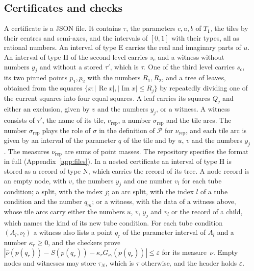 \documentclass[11pt]{amsart}
\theoremstyle{definition}
\theoremstyle{remark}
\numberwithin{equation}{section}
\newcommand{\re}{\operatorname{Re}}
\newcommand{\im}{\operatorname{Im}}
\begin{document}
\subsection*{Certificates and checks}
A certificate is a JSON file. It contains $\tau$, the parameters $c,a,b$ of $T_1$, the tiles by their centres and semi-axes, and the intervals of $[0,1]$ with their types, all as rational numbers. An interval of type E carries the real and imaginary parts of $u$. An interval of type H of the second level carries $s_c$ and a witness without numbers $y_j$ and without a stored $\tau'$, which is $\tau$. One of the third level carries $s_c$, its two pinned points $p_1,p_2$ with the numbers $R_1,R_2$, and a tree of leaves, obtained from the squares $\{x:|\re x|,|\im x|\le R_j\}$ by repeatedly dividing one of the current squares into four equal squares. A leaf carries its squares $Q_j$ and either an exclusion, given by $v$ and the numbers $y_j$, or a witness. A witness consists of $\tau'$, the name of its tile, $\nu_{\mathrm{rep}}$, a number $\sigma_{\mathrm{rep}}$ and the tile arcs. The number $\sigma_{\mathrm{rep}}$ plays the role of $\sigma$ in the definition of $\mathcal P$ for $\nu_{\mathrm{rep}}$, and each tile arc is given by an interval of the parameter $q$ of the tile and by $u$, $v$ and the numbers $y_j$. The measures $\nu_{\mathrm{rep}}$ are sums of point masses. The repository specifies the format in full (Appendix~\ref{app:files}). In a nested certificate an interval of type H is stored as a record of type N, which carries the record of its tree. A node record is an empty node, with $v$, the numbers $y_j$ and one number $v_l$ for each tube condition; a split, with the index $j$; an arc split, with the index $l$ of a tube condition and the number $q_m$; or a witness, with the data of a witness above, whose tile arcs carry either the numbers $u$, $v$, $y_j$ and $v_l$ or the record of a child, which names the kind of its new tube condition. For each tube condition $(A_l,\nu_l)$ a witness also lists a point $q_r$ of the parameter interval of $A_l$ and a number $\kappa_r\ge0$, and the checkers prove $|\hat\nu(p(q_r))-S(p(q_r))-\kappa_rG_{\nu_l}(p(q_r))|\le\varepsilon$ for its measure~$\nu$. Empty nodes and witnesses may store $\tau_N$, which is $\tau$ otherwise, and the header holds $\varepsilon$.
\end{document}
